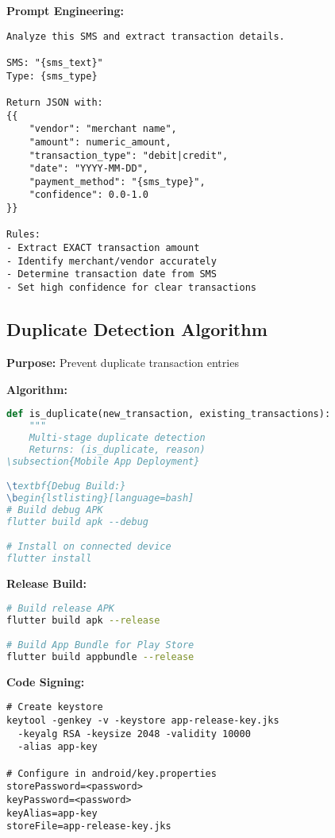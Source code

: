 \documentclass[11pt,a4paper]{report}
\begin{document}
\textbf{Prompt Engineering:}
\begin{lstlisting}
Analyze this SMS and extract transaction details.

SMS: "{sms_text}"
Type: {sms_type}

Return JSON with:
{{
    "vendor": "merchant name",
    "amount": numeric_amount,
    "transaction_type": "debit|credit",
    "date": "YYYY-MM-DD",
    "payment_method": "{sms_type}",
    "confidence": 0.0-1.0
}}

Rules:
- Extract EXACT transaction amount
- Identify merchant/vendor accurately
- Determine transaction date from SMS
- Set high confidence for clear transactions
\end{lstlisting}

\subsection{Duplicate Detection Algorithm}

\textbf{Purpose:} Prevent duplicate transaction entries

\textbf{Algorithm:}
\begin{lstlisting}[language=Python]
def is_duplicate(new_transaction, existing_transactions):
    """
    Multi-stage duplicate detection
    Returns: (is_duplicate, reason)
\subsection{Mobile App Deployment}

\textbf{Debug Build:}
\begin{lstlisting}[language=bash]
# Build debug APK
flutter build apk --debug

# Install on connected device
flutter install
\end{lstlisting}

\textbf{Release Build:}
\begin{lstlisting}[language=bash]
# Build release APK
flutter build apk --release

# Build App Bundle for Play Store
flutter build appbundle --release
\end{lstlisting}

\textbf{Code Signing:}
\begin{lstlisting}
# Create keystore
keytool -genkey -v -keystore app-release-key.jks 
  -keyalg RSA -keysize 2048 -validity 10000 
  -alias app-key

# Configure in android/key.properties
storePassword=<password>
keyPassword=<password>
keyAlias=app-key
storeFile=app-release-key.jks
\end{lstlisting}
\end{document}
